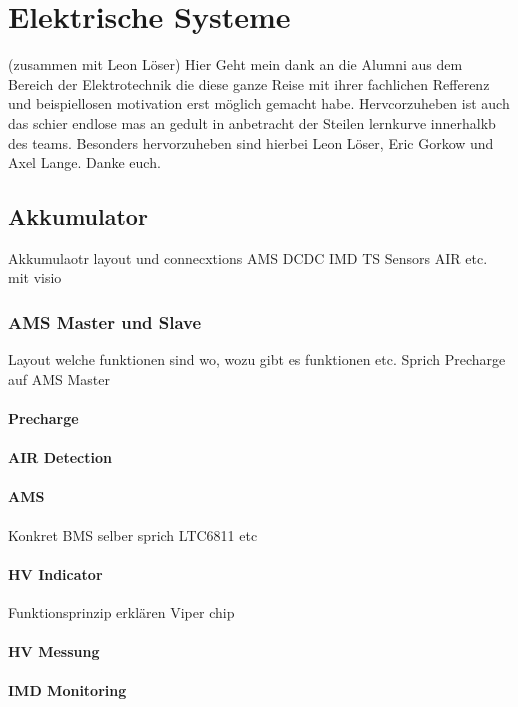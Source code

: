 
\chapter{Elektrische Systeme} (zusammen mit Leon Löser)
Hier Geht mein dank an die Alumni aus dem Bereich der Elektrotechnik die diese ganze Reise mit ihrer fachlichen Refferenz und beispiellosen motivation erst möglich gemacht habe. Hervcorzuheben ist auch das schier endlose mas an gedult in anbetracht der Steilen lernkurve innerhalkb des teams. Besonders hervorzuheben sind hierbei Leon Löser, Eric Gorkow und Axel Lange. Danke euch.
\section{Akkumulator}
Akkumulaotr layout und connecxtions
	AMS DCDC IMD TS Sensors AIR etc. mit visio

\subsection{AMS Master und Slave}
Layout welche funktionen sind wo, wozu gibt es funktionen etc.
Sprich Precharge auf AMS Master

\subsubsection{Precharge}


\subsubsection{AIR Detection}


\subsubsection{AMS}
Konkret BMS selber sprich LTC6811 etc

\subsubsection{HV Indicator}
Funktionsprinzip erklären Viper chip

\subsubsection{HV Messung}

\subsubsection{IMD Monitoring}

